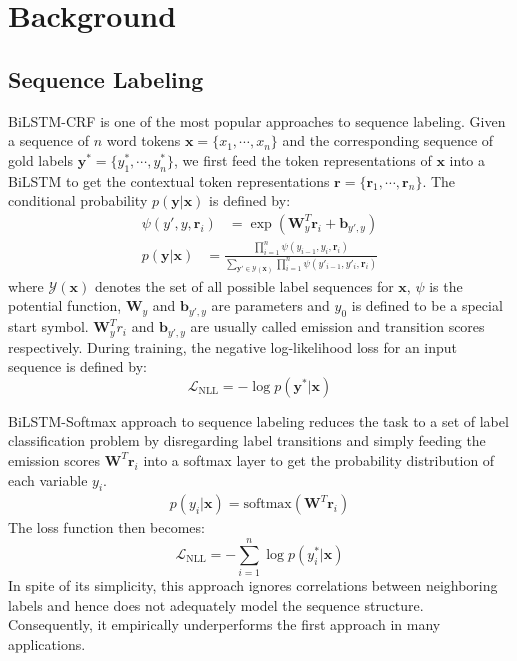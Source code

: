 \documentclass[11pt,a4paper]{article}
\newcommand{\xvec}{\mathbf{x}}
\newcommand{\yvec}{\mathbf{y}}
\newcommand{\bvec}{\mathbf{b}}
\newcommand{\Wvec}{\mathbf{W}}
\newcommand{\rvec}{\mathbf{r}}
\newcommand{\mcL}{\mathcal{L}}
\begin{document}
\section{Background}
\subsection{Sequence Labeling}
\label{sec:seq_lab}
BiLSTM-CRF \cite{lample-etal-2016-neural,ma-hovy-2016-end} is one of the most popular approaches to sequence labeling. Given a sequence of $n$ word tokens $\xvec = \{x_1, \cdots, x_n\}$ and the corresponding sequence of gold labels $\yvec^* = \{y_1^*, \cdots, y_n^*\}$, we first feed the token representations of $\xvec$ into a BiLSTM to get the contextual token representations $\rvec = \{\rvec_1, \cdots, \rvec_n\}$.
The conditional probability $p(\yvec|\xvec)$ is defined by:
\begin{align}
    \psi(y', y, \rvec_i) &= \exp(\Wvec_{y}^{T} \rvec_i + \bvec_{y',y}) \label{eq:psi}
\end{align}
\begin{align}
p(\yvec|\xvec) &= \frac{\prod\limits_{i=1}^{n} \psi(y_{i-1}, y_i, \rvec_i)}{\sum\limits_{\yvec' \in \mathcal{Y}(\xvec)} \prod\limits_{i=1}^{n} \psi(y'_{i-1}, y'_i, \rvec_i)}\label{eq:sentprob}
\end{align}
where $\mathcal{Y}(\xvec)$ denotes the set of all possible label sequences for $\xvec$,
$\psi$ is the potential function, $\Wvec_{y}$ and $\bvec_{y',y}$ are parameters and $y_0$ is defined to be a special start symbol. $\Wvec_{y}^{T}r_i$ and $\bvec_{y',y}$ are usually called emission and transition scores respectively. During training, the negative log-likelihood loss for an input sequence is defined by:
\begin{displaymath}
\mcL_{\text{NLL}} = - \log p(\yvec^*|\xvec)
\end{displaymath}

BiLSTM-Softmax approach to sequence labeling reduces the task to a set of label classification problem by disregarding label transitions and simply feeding the emission scores $\Wvec^{T}\mathbf{r}_i$ into a softmax layer to get the probability distribution of each variable $y_i$.
\begin{align}
p(y_i|\xvec) = \mathrm{softmax}(\Wvec^{T}\mathbf{r}_i) \label{eq:softmax}
\end{align}
The loss function then becomes:
\begin{displaymath}
\mcL_{\text{NLL}} = - \sum\limits_{i=1}^{n} \log p(y^*_{i}|\xvec)
\end{displaymath}
In spite of its simplicity, this approach ignores correlations between neighboring labels and hence does not adequately model the sequence structure. Consequently, it empirically underperforms the first approach in many applications. 
\end{document}
